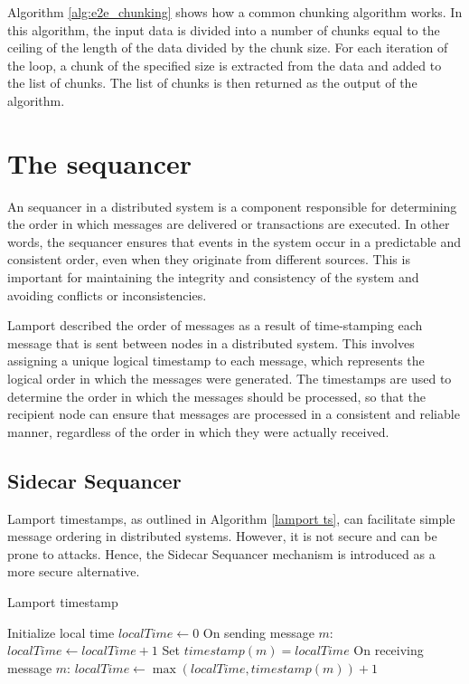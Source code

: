 \documentclass[twocolumn]{article}
\begin{document}
Algorithm \ref{alg:e2e_chunking} shows how a common chunking algorithm works. In this algorithm, the input data is divided into a number of chunks equal to the ceiling of the length of the data divided by the chunk size. For each iteration of the loop, a chunk of the specified size is extracted from the data and added to the list of chunks. The list of chunks is then returned as the output of the algorithm.

\section{The sequancer}

An sequancer in a distributed system is a component responsible for determining the order in which messages are delivered or transactions are executed. In other words, the sequancer ensures that events in the system occur in a predictable and consistent order, even when they originate from different sources. This is important for maintaining the integrity and consistency of the system and avoiding conflicts or inconsistencies.

Lamport described the order of messages as a result of time-stamping each message that is sent between nodes in a distributed system. This involves assigning a unique logical timestamp to each message, which represents the logical order in which the messages were generated. The timestamps are used to determine the order in which the messages should be processed, so that the recipient node can ensure that messages are processed in a consistent and reliable manner, regardless of the order in which they were actually received.

\subsection{Sidecar Sequancer}

Lamport timestamps, as outlined in Algorithm \ref{lamport ts}, can facilitate simple message ordering in distributed systems. However, it is not secure and can be prone to attacks. Hence, the Sidecar Sequancer mechanism is introduced as a more secure alternative.

\begin{algorithm}[h]
\caption{Lamport timestamp}
\label{lamport ts}
\begin{algorithmic}[1]
\State Initialize local time $localTime \gets 0$
\State On sending message $m$:
\State \quad $localTime \gets localTime + 1$
\State \quad Set $timestamp(m) = localTime$
\State On receiving message $m$:
\State \quad $localTime \gets \max(localTime, timestamp(m)) + 1$
\end{algorithmic}
\end{algorithm}
\end{document}
